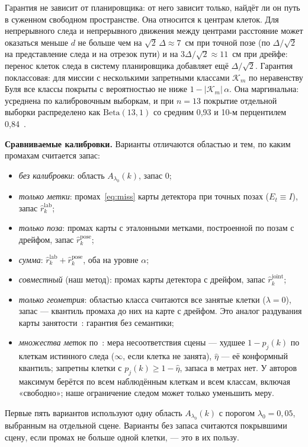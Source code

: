 Гарантия не зависит от планировщика: от него зависит только, найдёт ли он путь в суженном свободном пространстве. Она относится к центрам клеток. Для непрерывного следа и непрерывного движения между центрами расстояние может оказаться меньше $d$ не больше чем на $\sqrt 2\,\Delta \approx 7$~см при точной позе (по $\Delta/\sqrt 2$ на представление следа и на отрезок пути) и на $3\Delta/\sqrt 2 \approx 11$~см при дрейфе: перенос клеток следа в систему планировщика добавляет ещё $\Delta/\sqrt 2$. Гарантия поклассовая: для миссии с несколькими запретными классами $\mathcal K_m$ по неравенству Буля все классы покрыты с вероятностью не ниже $1 - |\mathcal K_m|\,\alpha$. Она маргинальна: усреднена по калибровочным выборкам, и при $n = 13$ покрытие отдельной выборки распределено как $\mathrm{Beta}(13, 1)$ со средним 0,93 и 10-м перцентилем 0,84~\cite{gentle}.

\textbf{Сравниваемые калибровки.} Варианты отличаются областью и тем, по каким промахам считается запас:
\begin{itemize}[nosep]
  \item \emph{без калибровки}: область $A_{\lambda_0}(k)$, запас 0;
  \item \emph{только метки}: промах~\eqref{eq:miss} карты детектора при точных позах ($E_t \equiv I$), запас $\hat r^{\mathrm{lab}}_k$;
  \item \emph{только поза}: промах карты с эталонными метками, построенной по позам с дрейфом, запас $\hat r^{\mathrm{pose}}_k$;
  \item \emph{сумма}: $\hat r^{\mathrm{lab}}_k + \hat r^{\mathrm{pose}}_k$, оба на уровне $\alpha$;
  \item \emph{совместный} (наш метод): промах карты детектора с дрейфом, запас $\hat r^{\mathrm{joint}}_k$;
  \item \emph{только геометрия}: областью класса считаются все занятые клетки ($\lambda = 0$), запас --- квантиль промаха до них на карте с дрейфом. Это аналог раздувания карты занятости~\cite{pwc}: гарантия без семантики;
  \item \emph{множества меток} по~\cite{sundarsingh}: мера несоответствия сцены --- худшее $1 - p_j(k)$ по клеткам истинного следа ($\infty$, если клетка не занята), $\hat\eta$ --- её конформный квантиль; запретны клетки с $p_j(k) \ge 1 - \hat\eta$, запаса в метрах нет. У авторов максимум берётся по всем наблюдённым клеткам и всем классам, включая «свободно»; наше ограничение следом может только уменьшить меру.
\end{itemize}
Первые пять вариантов используют одну область $A_{\lambda_0}(k)$ с порогом $\lambda_0 = 0{,}05$, выбранным на отдельной сцене. Варианты без запаса считаются покрывшими сцену, если промах не больше одной клетки, --- это в их пользу.

